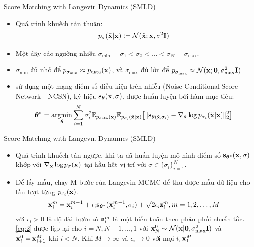 \documentclass[10pt]{beamer}
\theoremstyle{remark}
\numberwithin{algocf}{section}
\numberwithin{equation}{section}
\numberwithin{dl}{section}
\numberwithin{figure}{section}
\begin{document}
\begin{frame}{Score Matching with Langevin Dynamics (SMLD)}
    \begin{itemize}
		\item Quá trình khuếch tán thuận:
		\begin{equation*}
			p_{\sigma}(\tilde{\bold{x}} \vert \bold{x}) \vcentcolon = \mathcal{N}(\tilde{\bold{x}};\bold{x}, \sigma^2 \bold{I})
		\end{equation*}
		\item Một dãy các ngưỡng nhiễu $\sigma_{\min} = \sigma_1 < \sigma_2 < \dots < \sigma_N = \sigma_{\max}$.
		\item $\sigma_{\min}$ đủ nhỏ để $p_{\sigma_{\min}} \approx p_{\mathrm{data}}(\bold{x})$, và $\sigma_{\max}$ đủ lớn để $p_{\sigma_{\max}}\approx \mathcal{N}(\bold{x}; \bold{0}, \sigma_{\max}^2 \bold{I})$
		\item \citep{song2019generative} sử dụng một mạng điểm số điều kiện trên nhiễu (Noise Conditional Score Network - NCSN), ký hiệu $\bold{s}_{\boldsymbol{\theta}}(\bold{x}, \sigma)$, được huấn luyện bởi hàm mục tiêu:
		\begin{equation} \label{eq:1}
			\boldsymbol{\theta}^{\ast} = \underset{\boldsymbol{\theta}}{\mathrm{argmin}} \sum_{i=1}^N \sigma_i^2 \mathbb{E}_{p_{\mathrm{data}}(\bold{x})} \mathbb{E}_{p_{\sigma_i}(\tilde{\bold{x}} \vert \bold{x})} \big\lbrack \lVert \bold{s}_{\boldsymbol{\theta} (\tilde{\bold{x}}, \sigma_i)} - \nabla_{\tilde{\bold{x}}} \log p_{\sigma_i} (\tilde{\bold{x}} \vert \bold{x})  \rVert_2^2 \big\rbrack
		\end{equation}
	\end{itemize}
\end{frame}

\begin{frame}{Score Matching with Langevin Dynamics (SMLD)}
	\begin{itemize}
		\item Quá trình khuếch tán ngược, khi ta đã huấn luyện mô hình điểm số $\bold{s}_{\boldsymbol{\theta}^{\ast}}(\bold{x}, \sigma)$ khớp với $\nabla_{\bold{x}} \log p_{\sigma}(\bold{x})$ tại hầu hết vị trí với $\sigma \in \lbrace \sigma_i \rbrace_{i=1}^N$.
		\item Để lấy mẫu, \citep{song2019generative} chạy M bước của Langevin MCMC để thu được mẫu dữ liệu cho lần lượt từng $p_{\sigma_i}(\bold{x})$:
		\begin{equation} \label{eq:2}
			\bold{x}_i^m = \bold{x}_i^{m-1} + \epsilon_i \bold{s}_{\boldsymbol{\theta}^{\ast}} (\bold{x}_i^{m-1}, \sigma_i) + \sqrt{2 \epsilon_i} \bold{z}_i^m, m = 1, 2, \dots, M
		\end{equation}
		với $\epsilon_i > 0$ là độ dài bước và $\bold{z}_i^m$ là một biến tuân theo phân phối chuẩn tắc.
		\ref{eq:2} được lặp lại cho $i=N, N-1, \dots, 1$ với $\bold{x}_N^0 \sim \mathcal{N}(\bold{x} \vert \bold{0}, \sigma_{\max}^2 \bold{I})$ và $\bold{x}_i^0 = \bold{x}_{i+1}^M$ khi $i < N$. Khi $M \rightarrow \infty$ và $\epsilon_i \rightarrow 0$ với mọi $i, \bold{x}_1^M$
	\end{itemize}
\end{frame}
\end{document}
